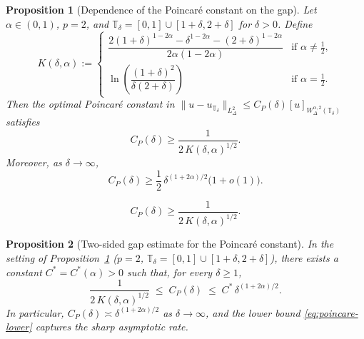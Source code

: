 \documentclass[10pt,a4paper]{amsart}
\newtheorem{proposition}{Proposition}
\newcommand{\T}{\mathbb{T}}
\begin{document}
\begin{proposition}[Dependence of the Poincar\'e constant on the gap]
\label{prop:poincare-gap}
Let $\alpha\in(0,1)$, $p=2$, and
$\T_\delta=[0,1]\cup[1+\delta,2+\delta]$ for $\delta>0$. Define
\[
K(\delta,\alpha) :=
\begin{cases}
\dfrac{2(1+\delta)^{1-2\alpha}-\delta^{1-2\alpha}-(2+\delta)^{1-2\alpha}}
{2\alpha(1-2\alpha)}
& \text{if }\alpha\neq\tfrac{1}{2},\\[8pt]
\ln\!\left(\dfrac{(1+\delta)^2}{\delta(2+\delta)}\right)
& \text{if }\alpha=\tfrac{1}{2}.
\end{cases}
\]
Then the optimal Poincar\'e constant in
$\|u-u_{\T_\delta}\|_{L^2_\Delta}\le C_P(\delta)[u]_{W^{\alpha,2}_\Delta(\T_\delta)}$
satisfies
\begin{equation}\label{eq:poincare-lower}
C_P(\delta) \ge \frac{1}{2\,K(\delta,\alpha)^{1/2}}.
\end{equation}
Moreover, as $\delta\to\infty$,
\begin{equation}\label{eq:poincare-blowup}
C_P(\delta) \ge \frac{1}{2}\,\delta^{(1+2\alpha)/2}\bigl(1+o(1)\bigr).
\end{equation}
\end{proposition}

\begin{equation}
C_P(\delta) \ge \frac{1}{2\,K(\delta,\alpha)^{1/2}}.
\end{equation}

\begin{proposition}[Two-sided gap estimate for the Poincar\'e constant]
\label{prop:two-sided-poincare}
In the setting of Proposition~\ref{prop:poincare-gap} ($p = 2$, 
$\mathbb{T}_\delta = [0,1] \cup [1+\delta, 2+\delta]$), there exists a 
constant $C^* = C^*(\alpha) > 0$ such that, for every $\delta \ge 1$,
\begin{equation}\label{eq:two-sided-poincare}
\frac{1}{2 \, K(\delta, \alpha)^{1/2}} 
\;\le\; C_P(\delta) 
\;\le\; C^* \, \delta^{(1+2\alpha)/2}.
\end{equation}
In particular, $C_P(\delta) \asymp \delta^{(1+2\alpha)/2}$ as 
$\delta \to \infty$, and the lower bound \eqref{eq:poincare-lower} 
captures the sharp asymptotic rate.
\end{proposition}
\end{document}
